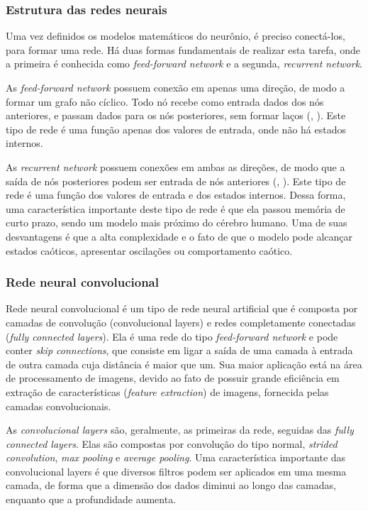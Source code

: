 \documentclass[]{politex}
\begin{document}
\subsubsection{Estrutura das redes neurais}
Uma vez definidos os modelos matemáticos do neurônio, é preciso conectá-los, para formar uma rede. Há duas formas fundamentais de realizar esta tarefa, onde a primeira é conhecida como \textit{feed-forward network} e a segunda, \textit{recurrent network}.

As \textit{feed-forward network} possuem conexão em apenas uma direção, de modo a formar um grafo não cíclico. Todo nó recebe como entrada dados dos nós anteriores, e passam dados para os nós posteriores, sem formar laços (, \citeyear{Russell}). Este tipo de rede é uma função apenas dos valores de entrada, onde não há estados internos.

As \textit{recurrent network} possuem conexões em ambas as direções, de modo que a saída de nós posteriores podem ser entrada de nós anteriores (, \citeyear{Russell}). Este tipo de rede é uma função dos valores de entrada e dos estados internos. Dessa forma, uma característica importante deste tipo de rede é que ela passou memória de curto prazo, sendo um modelo mais próximo do cérebro humano. Uma de suas desvantagens é que a alta complexidade e o fato de que o modelo pode alcançar estados caóticos, apresentar oscilações ou comportamento caótico.

\subsubsection{Rede neural convolucional}
Rede neural convolucional é um tipo de rede neural artificial que é composta por camadas de convolução (convolucional layers) e redes completamente conectadas (\textit{fully connected layers}). Ela é uma rede do tipo \textit{feed-forward network} e pode conter \textit{skip connections}, que consiste em ligar a saída de uma camada à entrada de outra camada cuja distância é maior que um. Sua maior aplicação está na área de processamento de imagens, devido ao fato de possuir grande eficiência em extração de características (\textit{feature extraction}) de imagens, fornecida pelas camadas convolucionais.

As \textit{convolucional layers} são, geralmente, as primeiras da rede, seguidas das \textit{fully connected layers}. Elas são compostas por convolução do tipo normal, \textit{strided convolution}, \textit{max pooling} e \textit{average pooling}. Uma característica importante das convolucional layers é que diversos filtros podem ser aplicados em uma mesma camada, de forma que a dimensão dos dados diminui ao longo das camadas, enquanto que a profundidade aumenta.
\end{document}
